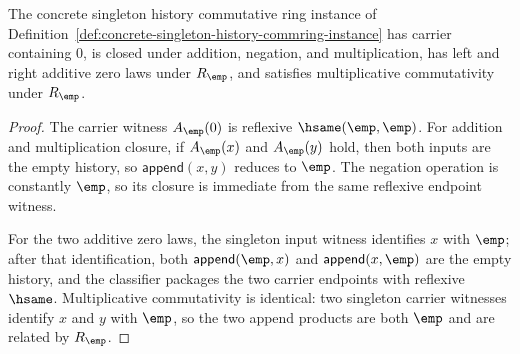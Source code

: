 \begin{theorem}
\label{thm:concrete-singleton-history-commring-laws}
The concrete singleton history commutative ring instance of
Definition~\ref{def:concrete-singleton-history-commring-instance} has carrier
containing $0$, is closed under addition, negation, and multiplication, has
left and right additive zero laws under $R_{\emp}$, and satisfies
multiplicative commutativity under $R_{\emp}$.
\end{theorem}
\begin{proof}
The carrier witness $A_{\emp}(0)$ is reflexive $\hsame(\emp,\emp)$. For
addition and multiplication closure, if $A_{\emp}(x)$ and $A_{\emp}(y)$ hold,
then both inputs are the empty history, so
$\mathsf{append}(x,y)$ reduces to $\emp$. The negation operation is constantly
$\emp$, so its closure is immediate from the same reflexive endpoint witness.

For the two additive zero laws, the singleton input witness identifies $x$
with $\emp$; after that identification, both
$\mathsf{append}(\emp,x)$ and $\mathsf{append}(x,\emp)$ are the empty history,
and the classifier packages the two carrier endpoints with reflexive
$\hsame$. Multiplicative commutativity is identical: two singleton carrier
witnesses identify $x$ and $y$ with $\emp$, so the two append products are
both $\emp$ and are related by $R_{\emp}$.
\end{proof}

